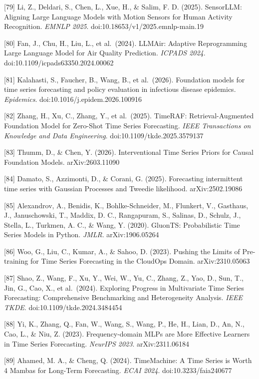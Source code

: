 {[}79{]} Li, Z., Deldari, S., Chen, L., Xue, H., \& Salim, F. D. (2025). SensorLLM: Aligning Large Language Models with Motion Sensors for Human Activity Recognition. \emph{EMNLP 2025}. doi:10.18653/v1/2025.emnlp-main.19

{[}80{]} Fan, J., Chu, H., Liu, L., et al.~(2024). LLMAir: Adaptive Reprogramming Large Language Model for Air Quality Prediction. \emph{ICPADS 2024}. doi:10.1109/icpads63350.2024.00062

{[}81{]} Kalahasti, S., Faucher, B., Wang, B., et al.~(2026). Foundation models for time series forecasting and policy evaluation in infectious disease epidemics. \emph{Epidemics}. doi:10.1016/j.epidem.2026.100916

{[}82{]} Zhang, H., Xu, C., Zhang, Y., et al.~(2025). TimeRAF: Retrieval-Augmented Foundation Model for Zero-Shot Time Series Forecasting. \emph{IEEE Transactions on Knowledge and Data Engineering}. doi:10.1109/tkde.2025.3579137

{[}83{]} Thumm, D., \& Chen, Y. (2026). Interventional Time Series Priors for Causal Foundation Models. arXiv:2603.11090

{[}84{]} Damato, S., Azzimonti, D., \& Corani, G. (2025). Forecasting intermittent time series with Gaussian Processes and Tweedie likelihood. arXiv:2502.19086

{[}85{]} Alexandrov, A., Benidis, K., Bohlke-Schneider, M., Flunkert, V., Gasthaus, J., Januschowski, T., Maddix, D. C., Rangapuram, S., Salinas, D., Schulz, J., Stella, L., Turkmen, A. C., \& Wang, Y. (2020). GluonTS: Probabilistic Time Series Models in Python. \emph{JMLR}. arXiv:1906.05264

{[}86{]} Woo, G., Liu, C., Kumar, A., \& Sahoo, D. (2023). Pushing the Limits of Pre-training for Time Series Forecasting in the CloudOps Domain. arXiv:2310.05063

{[}87{]} Shao, Z., Wang, F., Xu, Y., Wei, W., Yu, C., Zhang, Z., Yao, D., Sun, T., Jin, G., Cao, X., et al.~(2024). Exploring Progress in Multivariate Time Series Forecasting: Comprehensive Benchmarking and Heterogeneity Analysis. \emph{IEEE TKDE}. doi:10.1109/tkde.2024.3484454

{[}88{]} Yi, K., Zhang, Q., Fan, W., Wang, S., Wang, P., He, H., Lian, D., An, N., Cao, L., \& Niu, Z. (2023). Frequency-domain MLPs are More Effective Learners in Time Series Forecasting. \emph{NeurIPS 2023}. arXiv:2311.06184

{[}89{]} Ahamed, M. A., \& Cheng, Q. (2024). TimeMachine: A Time Series is Worth 4 Mambas for Long-Term Forecasting. \emph{ECAI 2024}. doi:10.3233/faia240677

